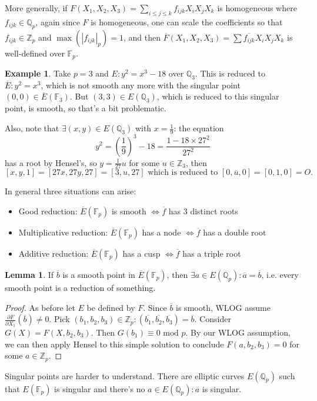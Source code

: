 \documentclass{article}
\newcommand{\F}{\mathbb{F}}
\newcommand{\Z}{\mathbb{Z}}
\newcommand{\Q}{\mathbb{Q}}
\newcommand{\Mod}{\text{ mod }}
\theoremstyle{definition}
\newtheorem{lemma}[defn]{Lemma}
\newtheorem{example}[defn]{Example}
\begin{document}
More generally, if $F(X_1,X_2,X_3)=\sum_{i\leq j\leq k}f_{ijk}X_iX_jX_k$ is homogeneous where $f_{ijk}\in\Q_p$, again since $F$ is homogeneous, one can scale the coefficients so that $f_{ijk}\in\Z_p$ and $\max(|f_{ijk}|_p)=1$, and then $\overline F(X_1,X_2,X_3)=\sum\overline{f_{ijk}}X_iX_jX_k$ is well-defined over $\F_p$.

\begin{example}
Take $p=3$ and $E:y^2=x^3-18$ over $\Q_3$. This is reduced to $\overline E:y^2=x^3$, which is not smooth any more with the singular point $(0,0)\in\overline E(\F_3)$. But $(3,3)\in E(\Q_3)$, which is reduced to this singular point, is smooth, so that's a bit problematic.

Also, note that $\exists (x,y)\in E(\Q_3)$ with $x=\frac19$: the equation
\[
y^2=\left(\frac{1}{9}\right)^3-18=\frac{1-18\times 27^2}{27^2}
\]
has a root by Hensel's, so $y=\frac{1}{27}u$ for some $u\in\Z_3$, then
\[
[x,y,1]=[27x,27y,27]=[3,u,27]\text{ which is reduced to }[0,\overline u,0]=[0,1,0]=O.
\]
\end{example}

In general three situations can arise:
\begin{itemize}
\item Good reduction: $\overline E(\F_p)$ is smooth $\iff \overline f$ has 3 distinct roots
\item Multiplicative reduction: $\overline E(\F_p)$ has a node $\iff \overline f$ has a double root
\item Additive reduction: $\overline E(\F_p)$ has a cusp $\iff \overline f$ has a triple root
\end{itemize}

\begin{lemma}
If $\overline b$ is a smooth point in $\overline E(\F_p)$, then $\exists a\in E(\Q_p):\overline a=\overline b$, i.e. every smooth point is a reduction of something.
\end{lemma}
\begin{proof}
As before let $E$ be defined by $F$. Since $\overline b$ is smooth, WLOG assume $\frac{\partial\overline F}{\partial X_1}(\overline b)\neq 0$. Pick $(b_1,b_2,b_3)\in\Z_p:(\overline{b_1},\overline{b_2},\overline{b_3})=\overline b$. Consider $G(X)=F(X,b_2,b_3)$. Then $G(b_1)\equiv 0\Mod p$. By our WLOG assumption, we can then apply Hensel to this simple solution to conclude $F(a,b_2,b_3)=0$ for some $a\in\Z_p$. 
\end{proof}

Singular points are harder to understand. There are elliptic curves $E(\Q_p)$ such that $E(\F_p)$ is singular and there's no $a\in E(\Q_p):\overline a$ is singular.
\end{document}
